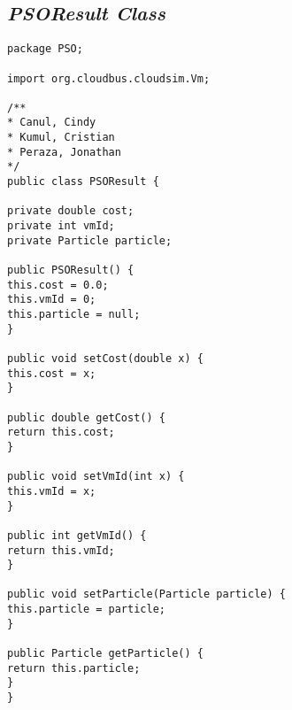 \subsection*{\textit{PSOResult Class}}
\begin{lstlisting}
package PSO;

import org.cloudbus.cloudsim.Vm;

/**
* Canul, Cindy
* Kumul, Cristian
* Peraza, Jonathan
*/
public class PSOResult {

private double cost;
private int vmId;
private Particle particle;

public PSOResult() {
this.cost = 0.0;
this.vmId = 0;
this.particle = null;
}

public void setCost(double x) {
this.cost = x;
}

public double getCost() {
return this.cost;
}

public void setVmId(int x) {
this.vmId = x;
}

public int getVmId() {
return this.vmId;
}

public void setParticle(Particle particle) {
this.particle = particle;
}

public Particle getParticle() {
return this.particle;
}
}

\end{lstlisting}


